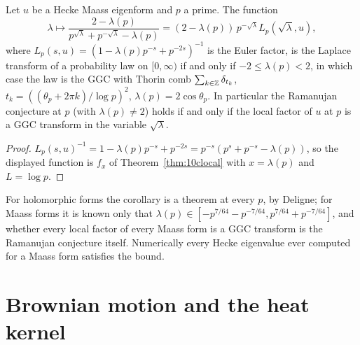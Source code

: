 \begin{corollary}\label{cor:msramanujan}
Let $u$ be a Hecke Maass eigenform and $p$ a prime. The function
\[
\lambda\mapsto\frac{2-\lambda(p)}{p^{\sqrt\lambda}+p^{-\sqrt\lambda}-\lambda(p)}=(2-\lambda(p))\,p^{-\sqrt\lambda}L_p(\sqrt\lambda,u),
\]
where $L_p(s,u)=(1-\lambda(p)p^{-s}+p^{-2s})^{-1}$ is the Euler factor,
is the Laplace transform of a probability law on $[0,\infty)$ if and only if $-2\le\lambda(p)<2$, in which case the law is the GGC with Thorin comb $\sum_{k\in\mathbb{Z}}\delta_{t_k}$, $t_k=((\theta_p+2\pi k)/\log p)^2$, $\lambda(p)=2\cos\theta_p$. In particular the Ramanujan conjecture at $p$ (with $\lambda(p)\ne2$) holds if and only if the local factor of $u$ at $p$ is a GGC transform in the variable $\sqrt\lambda$.
\end{corollary}

\begin{proof}
$L_p(s,u)^{-1}=1-\lambda(p)p^{-s}+p^{-2s}=p^{-s}(p^s+p^{-s}-\lambda(p))$, so the displayed function is $f_x$ of Theorem~\ref{thm:10clocal} with $x=\lambda(p)$ and $L=\log p$.
\end{proof}

For holomorphic forms the corollary is a theorem at every $p$, by Deligne; for Maass forms it is known only that $\lambda(p)\in[-p^{7/64}-p^{-7/64},p^{7/64}+p^{-7/64}]$, and whether every local factor of every Maass form is a GGC transform is the Ramanujan conjecture itself. Numerically every Hecke eigenvalue ever computed for a Maass form satisfies the bound.

\section{Brownian motion and the heat kernel}\label{sec:msbm}

